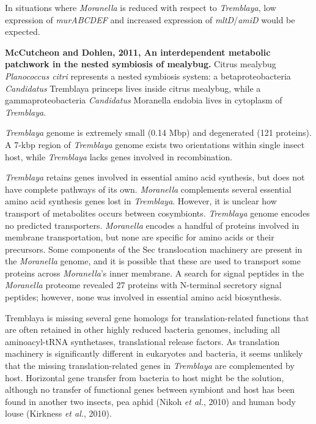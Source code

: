 \documentclass[11pt]{article}
\begin{document}
\begin{sloppypar}
In situations where \textit{Moranella} is reduced with respect to \textit{Tremblaya}, low expression of \textit{murABCDEF} and increased expression of \textit{mltD}/\textit{amiD} would be expected. 
\par
\textbf{McCutcheon and Dohlen, 2011, An interdependent metabolic patchwork in the nested symbiosis of mealybug.} \newline
Citrus mealybug \textit{Planococcus citri} represents a nested symbiosis system: 
a betaproteobacteria \textit{Candidatus} Tremblaya princeps lives inside citrus mealybug, while a gammaproteobacteria \textit{Candidatus} Moranella endobia lives in cytoplasm of \textit{Tremblaya}. 
\par
\textit{Tremblaya} genome is extremely small (0.14 Mbp) and degenerated (121 proteins). 
A 7-kbp region of \textit{Tremblaya} genome exists two orientations within single insect host, while \textit{Tremblaya} lacks genes involved in recombination. 
\par
\textit{Tremblaya} retains genes involved in essential amino acid synthesis, but does not have complete pathways of its own. \textit{Moranella} complements several essential amino acid synthesis genes lost in \textit{Tremblaya}. 
However, it is unclear how transport of metabolites occurs between cosymbionts. 
\textit{Tremblaya} genome encodes no predicted transporters. 
\textit{Moranella} encodes a handful of proteins involved in membrane transportation, but none are specific for amino acids
or their precursors. 
Some components of the Sec translocation machinery are present in the \textit{Moranella} genome, and it is possible that these are used to transport some proteins across \textit{Moranella}’s inner membrane. 
A search for signal peptides in the \textit{Moranella} proteome revealed 27 proteins with N-terminal secretory signal peptides; however, none was involved in essential amino acid biosynthesis. 
\par
Tremblaya is missing several gene homologs for translation-related functions that are often retained in other highly reduced bacteria genomes, including all aminoacyl-tRNA synthetases, translational release factors. 
As translation machinery is significantly different in eukaryotes and bacteria, it seems unlikely that the missing translation-related genes in \textit{Tremblaya} are complemented by host. 
Horizontal gene transfer from bacteria to host might be the solution, although no transfer of functional genes
between symbiont and host has been found in another two insects, pea aphid (Nikoh \textit{et al.}, 2010) and human body louse (Kirkness \textit{et al.}, 2010). 

\end{sloppypar}
\end{document}
